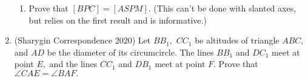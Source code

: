 \documentclass[mast]{lucky}
\begin{document}
\begin{enumerate}
\begin{enumerate}
        \item Prove that $[BPC]=[ASPM].$ (This can't be done with slanted axes, but relies on the first result and is informative.) 
    \end{enumerate}
    
    \item (Sharygin Correspondence 2020) Let $BB_1,$ $CC_1$ be altitudes of triangle $ABC,$ and $AD$ be the diameter of its circumcircle. The lines $BB_1$ and $DC_1$ meet at point $E,$ and the lines $CC_1$ and $DB_1$ meet at point $F.$ Prove that $\angle CAE=\angle BAF.$
\end{enumerate}
\end{document}
